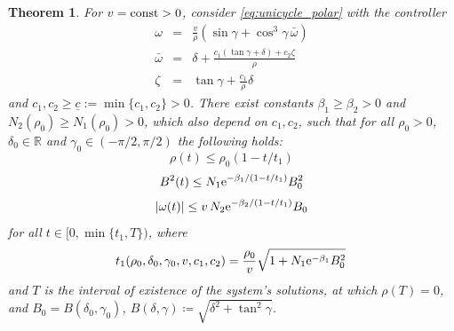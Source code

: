 \documentclass[letterpaper, 10 pt, conference]{ieeeconf}  %
\newtheorem{theorem}{Theorem}
\begin{document}
\begin{theorem}%
\label{thm:Dubins-FT-stabilize2}
For $v=\mbox{\rm const}>0$, consider \eqref{eq:unicycle_polar} with the controller
\begin{subequations}
\label{eq2-control-omega}
\begin{eqnarray}
\label{eq-third-controller1}
\omega &=& \frac{v}{\rho} \left(\sin\gamma +\cos^3\gamma \, \bar\omega\right)
\\
\label{eq2-control-omega2}
\bar\omega &=& \delta +\frac{c_1(\tan\gamma+\delta) +c_2\zeta}{\rho}
\\
\label{eq2-control-omega3}
\zeta &=& \tan\gamma+\frac{c_1}{\rho}\delta\,
\end{eqnarray}
\end{subequations}
and $c_1,c_2 \geq \underline c :=\min\{c_1,c_2\} > 0$. There exist 
constants $\beta_1\geq \beta_2 >0$ and $N_2(\rho_0)\geq N_1(\rho_0) >0$, which also depend on $c_1,c_2$, 
such that for all $\rho_0>0$, $\delta_0\in\mathbb{R}$ and $\gamma_0\in(-\pi/2,\pi/2)$ the following holds:
\begin{equation}
\label{eq2-rho-bound}
\rho(t)\leq \rho_0 (1-t/t_1)
\end{equation}
\begin{equation}
\label{eq2-deltan-bound}
B^2(t) \leq 
N_1 {\rm e}^{-\beta_1/({1-t/t_1})}
B^2_0
\end{equation}
\begin{equation}
\label{eq2-omega(t)-bound}
|\omega(t)| \leq v \, 
N_2 {\rm e}^{-\beta_2/({1-t/t_1})}B_0
\end{equation}
for all $t \in [0, \min\{t_1,T\})$, where
\begin{equation}
\label{eq-t1N1beta1}
t_1(\rho_0,\delta_0, \gamma_0, v,c_1,c_2) =\frac{\rho_0}{v}{\sqrt{1+N_1 {\rm e}^{-\beta_1}B^2_0}}\,
\end{equation}
and $T$ is the interval of existence of the system's solutions, at which $\rho(T)=0$, and $B_0 = B(\delta_0,\gamma_0)$, $B(\delta,\gamma) \coloneqq \sqrt{\delta^2 + \tan^2\gamma}$.
\end{theorem}
\end{document}

